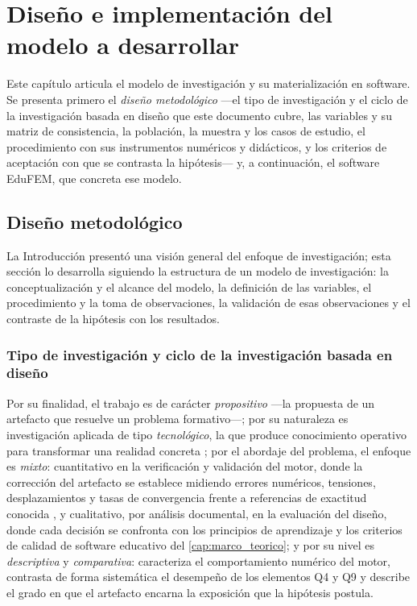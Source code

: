 \chapter{Diseño e implementación del modelo a desarrollar}
\label{cap:diseno}

Este capítulo articula el modelo de investigación y su materialización en software. Se presenta primero el \emph{diseño metodológico} —el tipo de investigación y el ciclo de la investigación basada en diseño que este documento cubre, las variables y su matriz de consistencia, la población, la muestra y los casos de estudio, el procedimiento con sus instrumentos numéricos y didácticos, y los criterios de aceptación con que se contrasta la hipótesis— y, a continuación, el software EduFEM, que concreta ese modelo.

\section{Diseño metodológico}
\label{sec:metodologia}

La Introducción presentó una visión general del enfoque de investigación; esta sección lo desarrolla siguiendo la estructura de un modelo de investigación: la conceptualización y el alcance del modelo, la definición de las variables, el procedimiento y la toma de observaciones, la validación de esas observaciones y el contraste de la hipótesis con los resultados.

\subsection{Tipo de investigación y ciclo de la investigación basada en diseño}
\label{sec:proceso-met}

Por su finalidad, el trabajo es de carácter \emph{propositivo} —la propuesta de un artefacto que resuelve un problema formativo—; por su naturaleza es investigación aplicada de tipo \emph{tecnológico}, la que produce conocimiento operativo para transformar una realidad concreta \autocite[pp.~90-92]{garciacordoba2005tecnologica}; por el abordaje del problema, el enfoque es \emph{mixto}: cuantitativo en la verificación y validación del motor, donde la corrección del artefacto se establece midiendo errores numéricos, tensiones, desplazamientos y tasas de convergencia frente a referencias de exactitud conocida \autocite[p.~6]{sampieri2018metodologia}, y cualitativo, por análisis documental, en la evaluación del diseño, donde cada decisión se confronta con los principios de aprendizaje y los criterios de calidad de software educativo del \autoref{cap:marco_teorico}; y por su nivel es \emph{descriptiva} y \emph{comparativa}: caracteriza el comportamiento numérico del motor, contrasta de forma sistemática el desempeño de los elementos Q4 y Q9 y describe el grado en que el artefacto encarna la exposición que la hipótesis postula.

